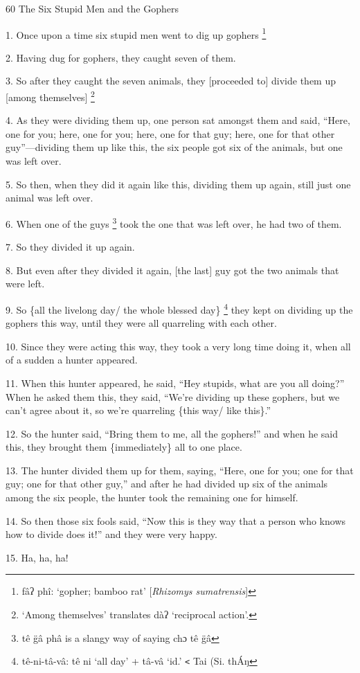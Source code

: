 
60 The Six Stupid Men and the Gophers

1. Once upon a time six stupid men went to dig up gophers \.\footnote{fâʔ phî: `gopher; bamboo rat' [\textit{Rhizomys sumatrensis}]}

2. Having dug for gophers, they caught seven of them.

3. So after they caught the seven animals, they [proceeded to] divide them up [among
themselves] \.\footnote{`Among themselves' translates dàʔ `reciprocal action'.}

4. As they were dividing them up, one person sat amongst them and said, ``Here,
one for you; here, one for you; here, one for that guy; here, one for that other
guy''---dividing them up like this, the six people got six of the animals, but
one was left over.

5. So then, when they did it again like this, dividing them up again, still just
one animal was left over.

6. When one of the guys \footnote{tê   g̈â   phâ is a slangy way of saying chɔ tê g̈â} took the one that was left over, he had two of them.

7. So they divided it up again.

8. But even after they divided it again, [the last] guy got the two animals that
were left.

9. So \{all the livelong day/ the whole blessed day\} \footnote{tê-ni-tâ-vâ: tê ni `all day' + tâ-vâ `id.' \texttt{<} Tai (Si. thÁŋ} they kept on dividing
up the gophers this way, until they were all quarreling with each other.

10. Since they were acting this way, they took a very long time doing it, when
all of a sudden a hunter appeared.

11. When this hunter appeared, he said, ``Hey stupids, what are you all doing?''
When he asked them this, they said, ``We're dividing up these gophers, but we can't
agree about it, so we're quarreling \{this way/ like this\}.''

12. So the hunter said, ``Bring them to me, all the gophers!'' and when he said
this, they brought them \{immediately\} all to one place.

13. The hunter divided them up for them, saying, ``Here, one for you; one for that
guy; one for that other guy,'' and after he had divided up six of the animals among
the six people, the hunter took the remaining one for himself.

14. So then those six fools said, ``Now this is they way that a person who knows
how to divide does it!'' and they were very happy.

15. Ha, ha, ha!

